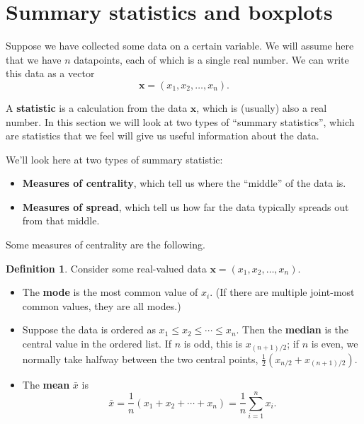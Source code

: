\documentclass[
  a4paper,
]{book}
\providecommand{\tightlist}{%
  \setlength{\itemsep}{0pt}\setlength{\parskip}{0pt}}
\theoremstyle{definition}
\newtheorem{definition}{Definition}[chapter]
\theoremstyle{definition}
\theoremstyle{definition}
\theoremstyle{definition}
\theoremstyle{remark}
\begin{document}
\hypertarget{summary-stat}{%
\section{Summary statistics and boxplots}\label{summary-stat}}

Suppose we have collected some data on a certain variable. We will assume here that we have \(n\) datapoints, each of which is a single real number. We can write this data as a vector
\[ \mathbf x = (x_1, x_2, \dots, x_n) . \]

A \textbf{statistic} is a calculation from the data \(\mathbf x\), which is (usually) also a real number. In this section we will look at two types of ``summary statistics'', which are statistics that we feel will give us useful information about the data.

We'll look here at two types of summary statistic:

\begin{itemize}
\tightlist
\item
  \textbf{Measures of centrality}, which tell us where the ``middle'' of the data is.
\item
  \textbf{Measures of spread}, which tell us how far the data typically spreads out from that middle.
\end{itemize}

Some measures of centrality are the following.

\begin{definition}

Consider some real-valued data \(\mathbf x = (x_1, x_2, \dots, x_n)\).

\begin{itemize}
\tightlist
\item
  The \textbf{mode} is the most common value of \(x_i\). (If there are multiple joint-most common values, they are all modes.)
\item
  Suppose the data is ordered as \(x_1 \leq x_2 \leq \cdots \leq x_n\). Then the \textbf{median} is the central value in the ordered list. If \(n\) is odd, this is \(x_{(n+1)/2}\); if \(n\) is even, we normally take halfway between the two central points, \(\frac12(x_{n/2}+x_{(n+1)/2})\).
\item
  The \textbf{mean} \(\bar x\) is
  \[ \bar x = \frac{1}{n}(x_1 + x_2 + \cdots + x_n) = \frac1n \sum_{i=1}^n x_i . \]
\end{itemize}

\end{definition}
\end{document}
